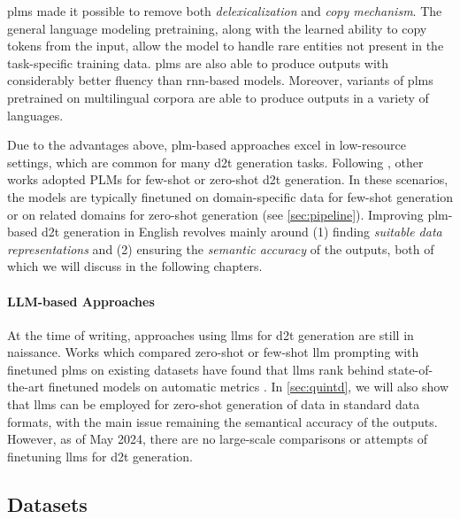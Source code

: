 {\acp{plm} made it possible to remove both \emph{delexicalization} and \emph{copy mechanism}. The general language modeling pretraining, along with the learned ability to copy tokens from the input, allow the model to handle rare entities not present in the task-specific training data. \acp{plm} are also able to produce outputs with considerably better fluency than \ac{rnn}-based models. Moreover, variants of \acp{plm} pretrained on multilingual corpora \cite{liuMultilingualDenoisingPretraining2020,xueMT5MassivelyMultilingual2021} are able to produce outputs in a variety of languages.

Due to the advantages above, \ac{plm}-based approaches excel in low-resource settings, which are common for many \ac{d2t} generation tasks. Following \citet{chenFewShotNLGPreTrained2019}, other works adopted PLMs for few-shot or zero-shot \ac{d2t} generation. In these scenarios, the models are typically finetuned on domain-specific data for few-shot generation \cite{changNeuralDatatoTextGeneration2021,suFewShotTabletoTextGeneration2021} or on related domains for zero-shot generation (see \autoref{sec:pipeline}). Improving \ac{plm}-based \ac{d2t} generation in English revolves mainly around (1) finding \emph{suitable data representations} and (2) ensuring the \emph{semantic accuracy} of the outputs, both of which we will discuss in the following chapters.

\paragraph{LLM-based Approaches} At the time of writing, approaches using \acp{llm} for \ac{d2t} generation are still in naissance. Works which compared zero-shot or few-shot \ac{llm} prompting with finetuned \acp{plm} on existing datasets have found that \acp{llm} rank behind state-of-the-art finetuned models on automatic metrics \cite{axelssonUsingLargeLanguage2023,yuanEvaluatingGenerativeModels2023}. In \autoref{sec:quintd}, we will also show that \acp{llm} can be employed for zero-shot generation of data in standard data formats, with the main issue remaining the semantical accuracy of the outputs. However, as of May 2024, there are no large-scale comparisons or attempts of finetuning \acp{llm} for \ac{d2t} generation.

\subsection{Datasets}
\label{sec:datasets}

}
